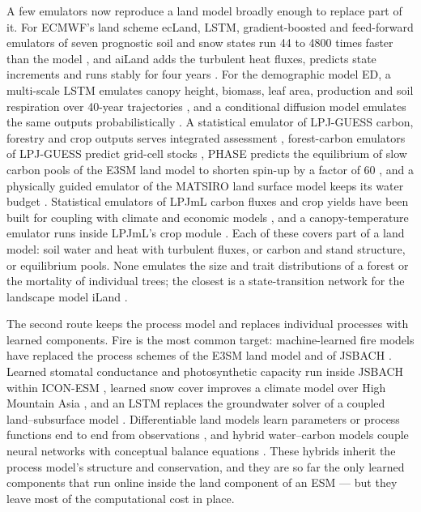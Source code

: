 \documentclass[11pt,a4paper]{article}
\begin{document}
A few emulators now reproduce a land model broadly enough to replace part of it. For ECMWF's land scheme ecLand, LSTM,
gradient-boosted and feed-forward emulators of seven prognostic soil and snow states run 44 to 4800 times faster than
the model \citep{R00067}, and aiLand adds the turbulent heat fluxes, predicts state increments and runs stably for four
years \citep{R00593}. For the demographic model ED, a multi-scale LSTM emulates canopy height, biomass, leaf area,
production and soil respiration over 40-year trajectories \citep{R01133}, and a conditional diffusion model emulates
the same outputs probabilistically \citep{R00514}. A statistical emulator of LPJ-GUESS carbon, forestry and crop
outputs serves integrated assessment \citep{R00661}, forest-carbon emulators of LPJ-GUESS predict grid-cell stocks
\citep{R00430}, PHASE predicts the equilibrium of slow carbon pools of the E3SM land model to shorten spin-up by a
factor of 60 \citep{R01211}, and a physically guided emulator of the MATSIRO land surface model keeps its water budget
\citep{R00129}. Statistical emulators of LPJmL carbon fluxes and crop yields have been built for coupling with
climate and economic models \citep{R01025,R00013}, and a canopy-temperature emulator runs inside LPJmL's crop module
\citep{R00568}. Each of these covers part of a land model: soil water and heat with turbulent fluxes, or carbon and
stand structure, or equilibrium pools. None emulates the size and trait distributions of a forest or the mortality of
individual trees; the closest is a state-transition network for the landscape model iLand \citep{Rammer2019}.

The second route keeps the process model and replaces individual processes with learned components. Fire is the most
common target: machine-learned fire models have replaced the process schemes of the E3SM land model and of JSBACH
\citep{R00089,R00911,R00342,R00278}. Learned stomatal conductance and photosynthetic capacity run inside JSBACH within
ICON-ESM \citep{R00602}, learned snow cover improves a climate model over High Mountain Asia \citep{R00902}, and an
LSTM replaces the groundwater solver of a coupled land--subsurface model \citep{R02497}. Differentiable land models
learn parameters or process functions end to end from observations \citep{R00316,R00407,R00975,R01005,R00383}, and
hybrid water--carbon models couple neural networks with conceptual balance equations
\citep{R00532,R00755}. These hybrids inherit the process model's structure and conservation, and they are so far the
only learned components that run online inside the land component of an ESM --- but they leave most of the
computational cost in place.
\end{document}
